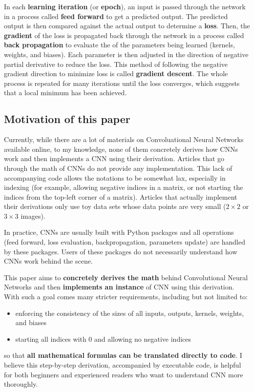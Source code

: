 \documentclass[12pt]{article}
\begin{document}
In each \textbf{learning iteration} (or \textbf{epoch}), an input is passed through the network in a process called \textbf{feed forward} to get a predicted output. The predicted output is then compared against the actual output to determine a \textbf{loss}. Then, the \textbf{gradient} of the loss is propagated back through the network in a process called \textbf{back propagation} to evaluate the  of the parameters being learned (kernels, weights, and biases). Each parameter is then adjusted in the direction of negative partial derivative to reduce the loss. This method of following the negative gradient direction to minimize loss is called \textbf{gradient descent}. The whole process is repeated for many iterations until the loss converges, which suggests that a local minimum has been achieved.

\subsection{Motivation of this paper}
Currently, while there are a lot of materials on Convoluational Neural Networks available online, to my knowledge, none of them concretely derives how CNNs work and then implements a CNN using their derivation. Articles that go through the math of CNNs do not provide any implementation. This lack of accompanying code allows the notations to be somewhat lax, especially in indexing (for example, allowing negative indices in a matrix, or not starting the indices from the top-left corner of a matrix). Articles that actually implement their derivations only use toy data sets whose data points are very small ($2 \times 2$ or $3 \times 3$ images).

In practice, CNNs are usually built with Python packages and all operations (feed forward, loss evaluation, backpropagation, parameters update) are handled by these packages. Users of these packages do not necessarily understand how CNNs work behind the scene.

This paper aims to \textbf{concretely derives the math} behind Convolutional Neural Networks and then \textbf{implements an instance} of CNN using this derivation. With such a goal comes many stricter requirements, including but not limited to:
\begin{itemize}
    \item enforcing the consistency of the sizes of all inputs, outputs, kernels, weights, and biases
    \item starting all indices with 0 and allowing no negative indices
\end{itemize}
so that \textbf{all mathematical formulas can be translated directly to code}. I believe this step-by-step derivation, accompanied by executable code, is helpful for both beginners and experienced readers who want to understand CNN more thoroughly.
\end{document}
